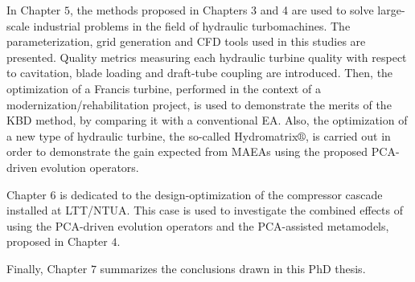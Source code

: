 In Chapter $5$, the methods proposed in Chapters 3 and 4 are used to solve large-scale industrial problems in the field of hydraulic turbomachines. The parameterization, grid generation and CFD tools used in this studies are presented. Quality metrics measuring each hydraulic turbine quality with respect to cavitation, blade loading and draft-tube coupling are introduced. Then, the optimization of a Francis turbine, performed in the context of a modernization/rehabilitation project, is used to demonstrate the merits of the KBD method, by comparing it with a conventional EA. Also, the optimization of a new type of hydraulic turbine, the so-called Hydromatrix$\circledR$, is carried out in order to demonstrate the gain expected from MAEAs using the proposed PCA-driven evolution operators.

Chapter $6$ is dedicated to the design-optimization of the compressor cascade installed at LTT/NTUA. This case is used to investigate the combined effects of using the PCA-driven evolution operators and the PCA-assisted metamodels,  proposed in Chapter $4$.

Finally, Chapter $7$ summarizes the conclusions drawn in this PhD thesis.      









